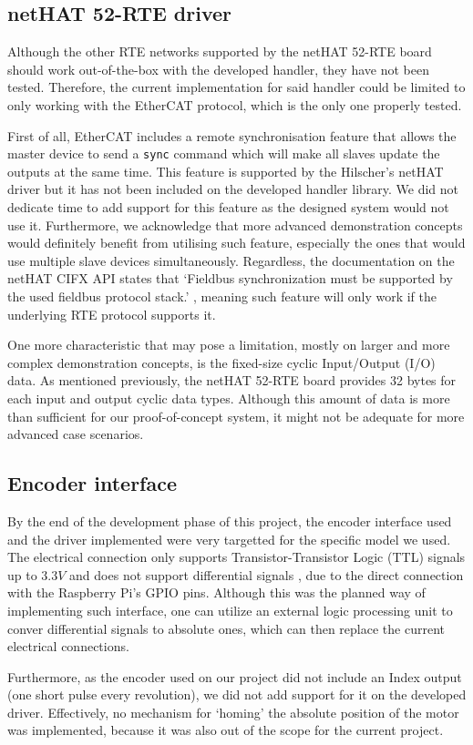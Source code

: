 \subsection{netHAT 52-RTE driver}
Although the other RTE networks supported by the netHAT 52-RTE board should work out-of-the-box with the developed handler, they have not been tested.
Therefore, the current implementation for said handler could be limited to only working with the EtherCAT protocol, which is the only one properly tested.

First of all, EtherCAT includes a remote synchronisation feature that allows the master device to send a \verb|sync| command which will make all slaves update the outputs at the same time.
This feature is supported by the Hilscher's netHAT driver but it has not been included on the developed handler library.
We did not dedicate time to add support for this feature as the designed system would not use it.
Furthermore, we acknowledge that more advanced demonstration concepts would definitely benefit from utilising such feature, especially the ones that would use multiple slave devices simultaneously.
Regardless, the documentation on the netHAT CIFX API states that `Fieldbus synchronization must be supported by the used fieldbus protocol stack.' \cite{nethat:cifx_api_docs}, meaning such feature will only work if the underlying RTE protocol supports it.

One more characteristic that may pose a limitation, mostly on larger and more complex demonstration concepts, is the fixed-size cyclic Input/Output (I/O) data.
As mentioned previously, the netHAT 52-RTE board provides 32 bytes for each input and output cyclic data types.
Although this amount of data is more than sufficient for our proof-of-concept system, it might not be adequate for more advanced case scenarios.

\subsection{Encoder interface}
By the end of the development phase of this project, the encoder interface used and the driver implemented were very targetted for the specific model we used.
The electrical connection only supports Transistor-Transistor Logic (TTL) signals up to $3.3V$ and does not support differential signals \cite{technology:diff-signals}, due to the direct connection with the Raspberry Pi's GPIO pins.
Although this was the planned way of implementing such interface, one can utilize an external logic processing unit to conver differential signals to absolute ones, which can then replace the current electrical connections.

Furthermore, as the encoder used on our project did not include an Index output (one short pulse every revolution), we did not add support for it on the developed driver.
Effectively, no mechanism for `homing' the absolute position of the motor was implemented, because it was also out of the scope for the current project.


